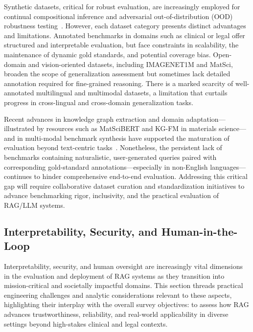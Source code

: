 \documentclass[sigconf]{acmart}
\begin{document}
Synthetic datasets, critical for robust evaluation, are increasingly employed for continual compositional inference and adversarial out-of-distribution (OOD) robustness testing~\cite{ref54,ref55,ref61,ref62}. However, each dataset category presents distinct advantages and limitations. Annotated benchmarks in domains such as clinical or legal offer structured and interpretable evaluation, but face constraints in scalability, the maintenance of dynamic gold standards, and potential coverage bias. Open-domain and vision-oriented datasets, including IMAGENET1M and MatSci, broaden the scope of generalization assessment but sometimes lack detailed annotation required for fine-grained reasoning. There is a marked scarcity of well-annotated multilingual and multimodal datasets, a limitation that curtails progress in cross-lingual and cross-domain generalization tasks.

Recent advances in knowledge graph extraction and domain adaptation—illustrated by resources such as MatSciBERT and KG-FM in materials science—and in multi-modal benchmark synthesis have supported the maturation of evaluation beyond text-centric tasks~\cite{ref7,ref11,ref19,ref20,ref33,ref35,ref36,ref37,ref47,ref61}. Nonetheless, the persistent lack of benchmarks containing naturalistic, user-generated queries paired with corresponding gold-standard annotations—especially in non-English languages—continues to hinder comprehensive end-to-end evaluation. Addressing this critical gap will require collaborative dataset curation and standardization initiatives to advance benchmarking rigor, inclusivity, and the practical evaluation of RAG/LLM systems.

\subsection{Interpretability, Security, and Human-in-the-Loop}

Interpretability, security, and human oversight are increasingly vital dimensions in the evaluation and deployment of RAG systems as they transition into mission-critical and societally impactful domains. This section threads practical engineering challenges and analytic considerations relevant to these aspects, highlighting their interplay with the overall survey objectives: to assess how RAG advances trustworthiness, reliability, and real-world applicability in diverse settings beyond high-stakes clinical and legal contexts.
\end{document}
